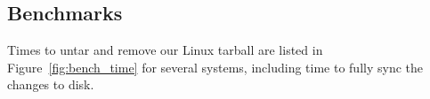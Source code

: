 \begin{comment}
\begin{figure}[t]
\vspace{-0.5\baselineskip}
\centering{
\texttt{[image: rb\_patch\_size]}
}
\vspace{-0.5\baselineskip}
\caption{\label{fig:patchsize-histo} \Rb\ \patch\ size histogram for a sample
workload (extracting a large archive into ext2). All the \patches\ larger than
63 bytes have been optimized into \nrb\ \patches. \Rb\ \patches\ 4 bytes and
smaller account for about 51\% of all \rb\ \patches.}
\end{figure}
\end{comment}

\subsection {Benchmarks}
\label{sec:eval:bench}



Times to untar and remove our Linux tarball are listed in
Figure~\ref{fig:bench_time} for several systems, including time to fully sync
the changes to disk.

